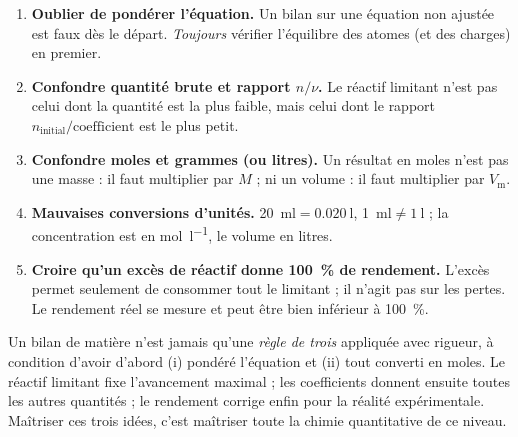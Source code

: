 \documentclass[11pt,a4paper]{article}
\newcommand{\molL}{\si{\mole\per\litre}}
\newcommand{\Vm}{V_{\mathrm{m}}}          %
\begin{document}
\begin{attention}
\begin{enumerate}[leftmargin=1.8em,topsep=2pt,itemsep=3pt]
  \item \textbf{Oublier de pondérer l'équation.} Un bilan sur une équation non ajustée est faux dès
        le départ. \emph{Toujours} vérifier l'équilibre des atomes (et des charges) en premier.
  \item \textbf{Confondre quantité brute et rapport $n/\nu$.} Le réactif limitant n'est pas celui
        dont la quantité est la plus faible, mais celui dont le rapport
        $n_{\text{initial}}/\text{coefficient}$ est le plus petit.
  \item \textbf{Confondre moles et grammes (ou litres).} Un résultat en moles n'est pas une masse :
        il faut multiplier par $M$ ; ni un volume : il faut multiplier par $\Vm$.
  \item \textbf{Mauvaises conversions d'unités.} \SI{20}{\milli\litre}$=\SI{0,020}{\litre}$,
        \SI{1}{\milli\litre}$\neq\SI{1}{\litre}$ ; la concentration est en \molL, le volume en
        litres.
  \item \textbf{Croire qu'un excès de réactif donne \SI{100}{\percent} de rendement.} L'excès
        permet seulement de consommer tout le limitant ; il n'agit pas sur les pertes. Le rendement
        réel se mesure et peut être bien inférieur à \SI{100}{\percent}.
\end{enumerate}
\end{attention}

\begin{remarque}
Un bilan de matière n'est jamais qu'une \emph{règle de trois} appliquée avec rigueur, à condition
d'avoir d'abord (i) pondéré l'équation et (ii) tout converti en moles. Le réactif limitant fixe
l'avancement maximal ; les coefficients donnent ensuite toutes les autres quantités ; le rendement
corrige enfin pour la réalité expérimentale. Maîtriser ces trois idées, c'est maîtriser toute la
chimie quantitative de ce niveau.
\end{remarque}
\end{document}
